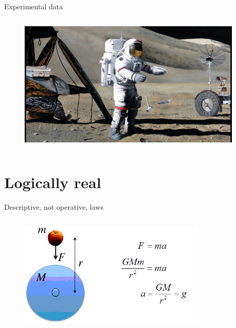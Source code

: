 \documentclass[xcolor=dvipsnames]{beamer}
\begin{document}
\begin{frame}[fragile]{Experimental data}
  \begin{columns}[T] %
    \begin{column}{0.99\textwidth}
      \begin{figure}[H]
        \centering
        \includegraphics[width=0.95\textwidth]{gravity}
      \end{figure}
    \end{column}%
  \end{columns}
\end{frame}


\section{Logically real}


\begin{frame}{Descriptive, not operative, laws}
  \begin{columns}[T] %
    \begin{column}{0.99\textwidth}
      \begin{figure}[H]
        \centering
        \includegraphics[width=0.8\textwidth]{gravitation-law}
      \end{figure}
    \end{column}%
  \end{columns}
\end{frame}
\end{document}
